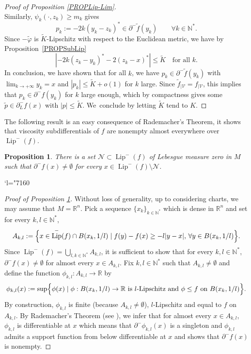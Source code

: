 \documentclass[JEP,XML,SOM,Unicode,NoFloatCountersInSection,published]{cedram}
\newcommand{\Changel}{\mathcode`l="7160}
\let\sep\mid
\DeclareMathOperator{\Lip}{Lip}
\newcommand\R{\mathbb R}
\newcommand\N{\mathbb N}
\newtheorem{proposition}[theorem]{Proposition}
\theoremstyle{definition}
\begin{document}
\begin{proof}[Proof of Proposition \ref{PROPLip-Lim}]
\[\]
Similarly, $\psi_{k}(\cdot,z_k) \geq m_k$ gives
\[
p_k:= -2k\left(y_k-z_k\right)^* \in \partial^- \tilde{f}(y_k) \qquad \forall k \in \N^*.
\]
Since $-\tilde{\varphi}$ is $\tilde{K}$-Lipschitz with respect to the Euclidean metric, we have by Proposition~\ref{PROPSubLip}
\[
\left|-2k\left(z_k-y_k\right)^* -2 \left(z_k-x\right)^* \right| \leq \tilde{K} \quad \text{for all } k.
\]
In conclusion, we have shown that for all $k$, we have $p_k \in \partial^- \tilde{f}(y_k)$ with $\lim_{k\to +\infty} y_k=x$ and $|p_k| \leq \tilde{K} +o(1)$ for $k$ large. Since $\tilde{f}_{\vert \mathcal{V}}=f_{\vert \mathcal{V}}$, this implies that $p_k \in \partial^- f(y_k)$ for $k$ large enough, which by compactness gives some $\tilde{p} \in \partial^-_L f(x)$ with $|p|\leq \tilde{K}$. We~conclude by letting $\tilde{K}$ tend to $K$.
\end{proof}

The following result is an easy consequence of Rademacher's Theorem, it shows that viscosity subdifferentials of $f$ are nonempty almost everywhere over $\Lip^-(f)$.

\begin{proposition}\label{PROPLip-Sub}
There is a set $\mathcal{N}\subset \Lip^-(f)$ of Lebesgue measure zero in $M$ such that $\partial^-f(x)\neq \emptyset$ for every $x\in \Lip^-(f) \setminus \mathcal{N}$.
\end{proposition}

\Changel

\begin{proof}[Proof of Proposition \ref{PROPLip-Sub}]
Without loss of generality, up to considering charts, we may assume that $M=\R^n$. Pick a sequence $\{x_k\}_{k\in \N^*}$ which is dense in $\R^n$ and set for every $k,l \in \N^*$,
\[
A_{k,l} :=\Bigl\{ x\in \Lip^-(f) \cap B(x_k,1/l) \sep  f(y)-f(x) \geq -l|y-x|, \, \forall y\in B(x_k,1/l)\Bigr\}.
\]
Since $\Lip^-(f)=\bigcup_{l,k\in \N^*}A_{k,l}$, it is sufficient to show that for every $k,l\in \N^*$, $\partial^-f(x)\neq \emptyset$ for almost every $x\in A_{k,l}$. Fix $k,l\in \N^*$ such that $A_{k,l} \neq \emptyset$ and define the function $\phi_{k,l}:A_{k,l} \to \R$ by
\[
\phi_{k,l}(x) := \sup \Bigl\{\phi(x) \sep  \phi: B(x_k,1/l)\to \R \text{ is $l$-Lipschitz and } \phi\leq f \text{ on } B(x_k,1/l)\Bigr\}.
\]
By construction, $\phi_{k,l}$ is finite (because $A_{k,l} \neq \emptyset$), $l$-Lipschitz and equal to $f$ on $A_{k,l}$. By Rademacher's Theorem (see \eg \cite{eg15,federer69}), we infer that for almost every $x\in A_{k,l}$, $\phi_{k,l}$ is differentiable at $x$ which means that $\partial^-\phi_{k,l}(x)$ is a singleton and $\phi_{k,l}$ admits a support function from below differentiable at $x$ and shows that $\partial^- f(x)$ is nonempty.
\end{proof}
\end{document}
